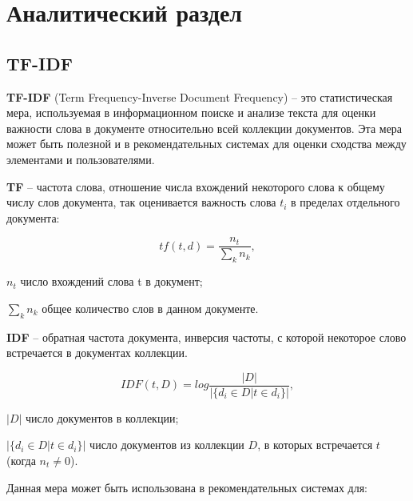 \documentclass[12pt]{report}
\begin{document}
\pagebreak


\chapter{Аналитический раздел}

\section{TF-IDF}

\textbf{TF-IDF} (Term Frequency-Inverse Document Frequency) -- это статистическая мера, используемая в информационном поиске и анализе текста для оценки важности слова в документе относительно всей коллекции документов. Эта мера может быть полезной и в рекомендательных системах для оценки сходства между элементами и пользователями. \cite{tfidf}

\textbf{TF} -- частота слова, отношение числа вхождений некоторого слова к общему числу слов документа, так оценивается важность слова $t_i$ в пределах отдельного документа:

\begin{equation}
	tf(t, d) = \frac{n_t}{\sum_{k}{n_k}},
\end{equation}
\begin{eqexpl}[15mm]
\item{$n_t$} число вхождений слова t в документ;
\item{$\sum_{k}{n_k}$} общее количество слов в данном документе.
\end{eqexpl}

\textbf{IDF} -- обратная частота документа, инверсия частоты, с которой некоторое слово встречается в документах коллекции.

\begin{equation}
	IDF(t, D) = log \frac{|D|}{|\{d_i \in D | t \in d_i\}|},
\end{equation}
\begin{eqexpl}[15mm]
\item{$|D|$} число документов в коллекции;
\item{$|\{d_i \in D | t \in d_i\}|$} число документов из коллекции $D$, в которых встречается $t$ (когда $n_t \neq 0$).
\end{eqexpl}

Данная мера может быть использована в рекомендательных системах для:
\end{document}

